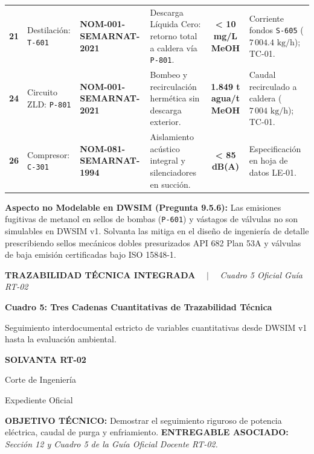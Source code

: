 \documentclass[10pt,landscape]{article}
\newcommand{\slideheader}[4]{%
  \noindent
  \begin{minipage}[c]{0.78\textwidth}
    {\fontsize{7pt}{8.5pt}\selectfont \textbf{\color{accentcyan}#1} \ \ $|$ \ \ \textit{\color{black!70}#2}}\par
    \vspace{1.5pt}
    {\fontsize{12pt}{14pt}\selectfont \textbf{\color{navyblue}#3}}\par
    \vspace{1.5pt}
    {\fontsize{7.2pt}{8.8pt}\selectfont \color{black!80}#4}
  \end{minipage}
  \hfill
  \begin{minipage}[c]{0.20\textwidth}
    \begin{tcolorbox}[colback=navyblue,colframe=navyblue,arc=1.5mm,boxrule=0pt,top=2.5pt,bottom=2.5pt,left=4pt,right=4pt]
      \centering
      {\color{white}\fontsize{7.5pt}{9pt}\selectfont \textbf{SOLVANTA RT-02}}\par
      \vspace{1pt}
      {\color{accentcyan}\fontsize{6pt}{7.5pt}\selectfont Corte de Ingeniería}\par
      {\color{white!80}\fontsize{5.5pt}{7pt}\selectfont Expediente Oficial}
    \end{tcolorbox}
  \end{minipage}
  \par\vspace{2pt}
  \noindent{\color{navyblue}\rule{\textwidth}{1.0pt}}
  \par\vspace{2pt}
}
\newenvironment{objectivebox}[2]{%
  \begin{tcolorbox}[
    colback=softblue,
    colframe=accentcyan,
    arc=1.5mm,
    boxrule=0.7pt,
    top=2pt,
    bottom=2pt,
    left=6pt,
    right=6pt
  ]
    \noindent
    \textbf{\fontsize{6.5pt}{7.8pt}\selectfont \color{navyblue}OBJETIVO TÉCNICO:} 
    {\fontsize{6.5pt}{7.8pt}\selectfont #1}
    \hfill
    \textbf{\fontsize{6.5pt}{7.8pt}\selectfont \color{navyblue}ENTREGABLE ASOCIADO:} 
    {\fontsize{6.5pt}{7.8pt}\selectfont \textit{#2}}
  \end{tcolorbox}
  \vspace{1.5pt}
}{}
\begin{document}
\begin{tabularx}{\textwidth}{c p{2.8cm} p{3.2cm} p{3.8cm} c X}
  \rowcolor{rowodd}
  \textbf{21} & Destilación: \texttt{T-601} & \textbf{NOM-001-SEMARNAT-2021} & Descarga Líquida Cero: retorno total a caldera vía \texttt{P-801}. & \textbf{< 10 mg/L MeOH} & Corriente fondos \texttt{S-605} ($7\,004.4\text{ kg/h}$); TC-01. \\
  \rowcolor{roweven}
  \textbf{24} & Circuito ZLD: \texttt{P-801} & \textbf{NOM-001-SEMARNAT-2021} & Bombeo y recirculación hermética sin descarga exterior. & \textbf{1.849 t agua/t MeOH} & Caudal recirculado a caldera ($7\,004\text{ kg/h}$); TC-01. \\
  \rowcolor{rowodd}
  \textbf{26} & Compresor: \texttt{C-301} & \textbf{NOM-081-SEMARNAT-1994} & Aislamiento acústico integral y silenciadores en succión. & \textbf{< 85 dB(A)} & Especificación en hoja de datos LE-01. \\
  \bottomrule
\end{tabularx}

\vspace{2pt}
\begin{tcolorbox}[colback=white,colframe=navyblue!40,arc=1.5mm,boxrule=0.6pt,top=2pt,bottom=2pt,left=6pt,right=6pt]
  \scriptsize
  \textbf{\color{navyblue}Aspecto no Modelable en DWSIM (Pregunta 9.5.6):} Las emisiones fugitivas de metanol en sellos de bombas (\texttt{P-601}) y vástagos de válvulas no son simulables en DWSIM v1. Solvanta las mitiga en el diseño de ingeniería de detalle prescribiendo sellos mecánicos dobles presurizados API 682 Plan 53A y válvulas de baja emisión certificadas bajo ISO 15848-1.
\end{tcolorbox}

\newpage

\slideheader{TRAZABILIDAD TÉCNICA INTEGRADA}{Cuadro 5 Oficial Guía RT-02}{Cuadro 5: Tres Cadenas Cuantitativas de Trazabilidad Técnica}{Seguimiento interdocumental estricto de variables cuantitativas desde DWSIM v1 hasta la evaluación ambiental.}

\begin{objectivebox}{Demostrar el seguimiento riguroso de potencia eléctrica, caudal de purga y enfriamiento.}{Sección 12 y Cuadro 5 de la Guía Oficial Docente RT-02.}
\end{objectivebox}

\vspace{1.5pt}
\end{document}
